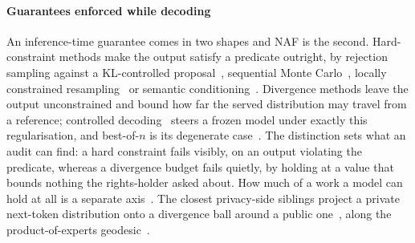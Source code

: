 \paragraph{Guarantees enforced while decoding}
An inference-time guarantee comes in two shapes and NAF is the second. Hard-constraint methods make the output satisfy a predicate outright, by rejection sampling against a KL-controlled proposal~\cite{kim2025guaranteed}, sequential Monte Carlo~\cite{loula2025smc}, locally constrained resampling~\cite{ahmed2024resampling} or semantic conditioning~\cite{ahmed2025semantic}. Divergence methods leave the output unconstrained and bound how far the served distribution may travel from a reference; controlled decoding~\cite{mudgal2024controlled} steers a frozen model under exactly this regularisation, and best-of-$n$ is its degenerate case~\cite{gao2023scaling,beirami2025bestofn}. The distinction sets what an audit can find: a hard constraint fails visibly, on an output violating the predicate, whereas a divergence budget fails quietly, by holding at a value that bounds nothing the rights-holder asked about. How much of a work a model can hold at all is a separate axis~\cite{morris2025memorize}. The closest privacy-side siblings project a private next-token distribution onto a divergence ball around a public one~\cite{flemings2024pmixed,flemings2024adaptive,amin2024private,tang2024privacy,thareja2025dpfusion}, along the product-of-experts geodesic~\cite{hinton2002poe,liu2024dera,dekoninck2024arithmetic}.

